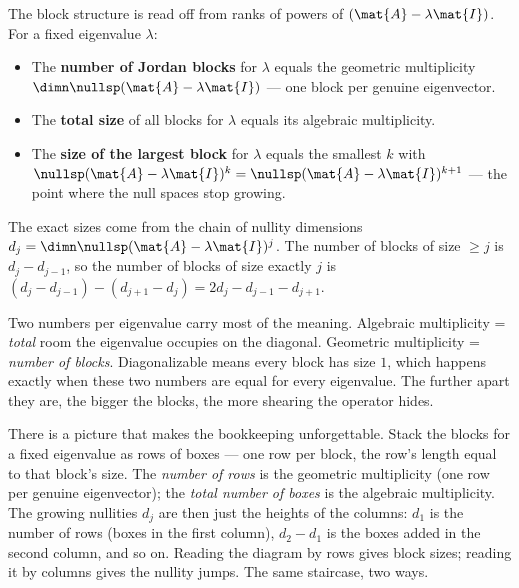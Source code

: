 \begin{formalbox}
The block structure is read off from ranks of powers of $(\mat{A}-\lambda\mat{I})$. For
a fixed eigenvalue $\lambda$:
\begin{itemize}
\item The \textbf{number of Jordan blocks} for $\lambda$ equals the geometric
  multiplicity $\dimn\nullsp(\mat{A}-\lambda\mat{I})$ --- one block per genuine
  eigenvector.
\item The \textbf{total size} of all blocks for $\lambda$ equals its algebraic
  multiplicity.
\item The \textbf{size of the largest block} for $\lambda$ equals the smallest $k$ with
  $\nullsp(\mat{A}-\lambda\mat{I})^k=\nullsp(\mat{A}-\lambda\mat{I})^{k+1}$ --- the point
  where the null spaces stop growing.
\end{itemize}
The exact sizes come from the chain of nullity dimensions
$d_j=\dimn\nullsp(\mat{A}-\lambda\mat{I})^j$. The number of blocks of size $\ge j$ is
$d_j-d_{j-1}$, so the number of blocks of size exactly $j$ is
$(d_j-d_{j-1})-(d_{j+1}-d_j) = 2d_j - d_{j-1} - d_{j+1}$.
\end{formalbox}

\begin{focusbox}
Two numbers per eigenvalue carry most of the meaning. Algebraic multiplicity =
\emph{total} room the eigenvalue occupies on the diagonal. Geometric multiplicity =
\emph{number of blocks}. Diagonalizable means every block has size $1$, which happens
exactly when these two numbers are equal for every eigenvalue. The further apart they
are, the bigger the blocks, the more shearing the operator hides.
\end{focusbox}

There is a picture that makes the bookkeeping unforgettable. Stack the blocks for a fixed
eigenvalue as rows of boxes --- one row per block, the row's length equal to that block's
size. The \emph{number of rows} is the geometric multiplicity (one row per genuine
eigenvector); the \emph{total number of boxes} is the algebraic multiplicity. The growing
nullities $d_j$ are then just the heights of the columns: $d_1$ is the number of rows
(boxes in the first column), $d_2-d_1$ is the boxes added in the second column, and so on.
Reading the diagram by rows gives block sizes; reading it by columns gives the nullity
jumps. The same staircase, two ways.

